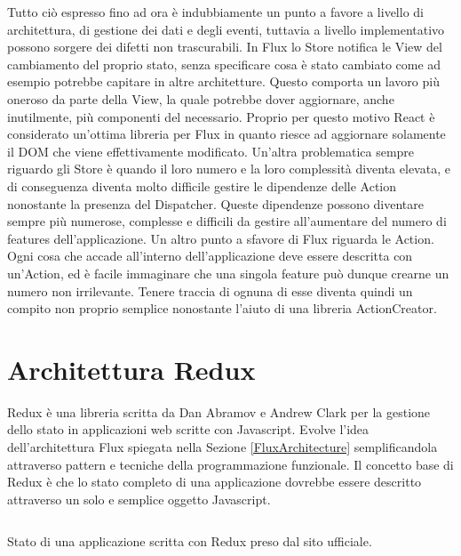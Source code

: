 Tutto ciò espresso fino ad ora è indubbiamente un punto a favore a livello di architettura, di gestione dei dati e degli eventi, tuttavia a livello implementativo possono sorgere dei difetti non trascurabili.
In Flux lo Store notifica le View del cambiamento del proprio stato, senza specificare cosa è stato cambiato come ad esempio potrebbe capitare in altre architetture. Questo comporta un lavoro più oneroso da parte della View, la quale potrebbe dover aggiornare, anche inutilmente, più componenti del necessario. Proprio per questo motivo React è considerato un'ottima libreria per Flux in quanto riesce ad aggiornare solamente il DOM che viene effettivamente modificato.
Un'altra problematica sempre riguardo gli Store è quando il loro numero e la loro complessità diventa elevata, e di conseguenza diventa molto difficile gestire le dipendenze delle Action nonostante la presenza del Dispatcher. Queste dipendenze possono diventare sempre più numerose, complesse e difficili da gestire all'aumentare del numero di features dell'applicazione.
Un altro punto a sfavore di Flux riguarda le Action. Ogni cosa che accade all'interno dell'applicazione deve essere descritta con un'Action, ed è facile immaginare che una singola feature può dunque crearne un numero non irrilevante. Tenere traccia di ognuna di esse diventa quindi un compito non proprio semplice nonostante l'aiuto di una libreria ActionCreator.

\section{Architettura Redux}
\label{ReduxArchitecture}

Redux è una libreria scritta da Dan Abramov e Andrew Clark per la gestione dello stato in applicazioni web scritte con Javascript. Evolve l'idea dell'architettura Flux spiegata nella Sezione \ref{FluxArchitecture} semplificandola attraverso pattern e tecniche della programmazione funzionale. Il concetto base di Redux è che lo stato completo di una applicazione dovrebbe essere descritto attraverso un solo e semplice oggetto Javascript.

\begin{listing}[ht]
\inputminted{javascript}{sources/exampleReduxState.js}
\caption{Stato di una applicazione scritta con Redux preso dal sito ufficiale.} 
\label{exampleReduxState} 
\end{listing}

